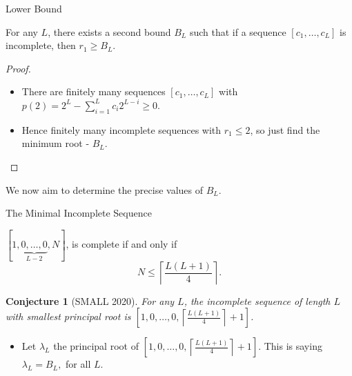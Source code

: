 \documentclass[handout]{beamer}
\newtheorem*{conjecture}{Conjecture}
\begin{document}
\begin{frame}{Lower Bound}
	\begin{lemma}[SMALL 2020]
	For any $L $, there exists a second bound $B_{L}$ such that if a sequence $[c_1,\ldots , c_{L}]$ is incomplete, then  $r_1\geq B_{L}$.
\end{lemma}
\pause
\begin{proof}
	\begin{itemize}
	\item
		There are finitely many sequences $[ c_1,\ldots , c_{L} ]$ with $p(2)=2^{L}-\sum_{i=1}^{L}c_{i}2^{L-i}\geq 0$. %
		\pause
\item
	 Hence finitely many incomplete sequences with $r_1\leq 2$, so just find the minimum root -  $B_{L}$.\end{itemize} 
\end{proof}
\pause
We now aim to determine the precise values of $B_{L}$.
\end{frame}
\begin{frame}{The Minimal Incomplete Sequence}
	    \begin{theorem}[SMALL 2020]
		    $[1, \underbrace{0, \ldots, 0}_{L-2}, N]$, is complete if and only if \vspace{-0.2in}
            \[
		    N \leq \left\lceil \frac{L(L+1)}{4}  \right\rceil.
            \]
	    \end{theorem}

	    \pause
\begin{conjecture}[SMALL 2020]
For any $L$, the incomplete sequence of length $L$ with smallest principal root is $[1, 0, \ldots, 0, \left\lceil \frac{L(L+1)}{4}\right\rceil+1]$.
\end{conjecture}
\pause
\begin{itemize}
\item

	Let $\lambda _{L}$ the principal root of $[1,0,\ldots , 0, \left\lceil \frac{L(L+1)}{4} \right\rceil +1].$ This is saying $\lambda _{L}=B_{L},$ for all $L.$
\end{itemize}
\end{frame}
\end{document}
